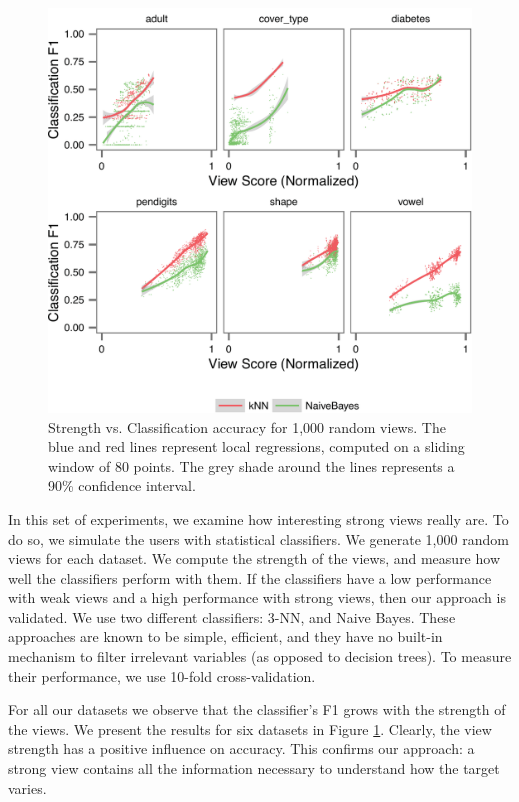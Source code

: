 \begin{figure}[t!]
\centering
\includegraphics[width=\columnwidth]{plots/compare-strength-f1}
\caption{Strength vs. Classification accuracy for 1,000 random views. The blue
    and red lines represent local regressions, computed on a sliding window of
    80 points. The grey shade around the lines represents a 90\% confidence
interval.}
\label{pic:strength-vs-f1}
\end{figure}

In this set of experiments, we examine how interesting strong views really are.
To do so, we simulate the users with statistical classifiers.  We generate
1,000 random views for each dataset. We compute the strength of the views, and
measure how well the classifiers perform with them. If the classifiers have a
low performance with weak views and a high performance with strong views, then
our approach is validated. We use two different classifiers: 3-NN, and Naive
Bayes.  These approaches are known to be simple, efficient, and they have no
built-in mechanism to filter irrelevant variables (as opposed to decision
trees). To measure their performance, we use 10-fold cross-validation.

For all our datasets we observe that the classifier's F1 grows with the
strength of the views. We present the results for six datasets in Figure
\ref{pic:strength-vs-f1}. Clearly, the view strength has a positive influence
on accuracy. This confirms our approach: a strong view contains all the
information necessary to understand how the target varies. 

